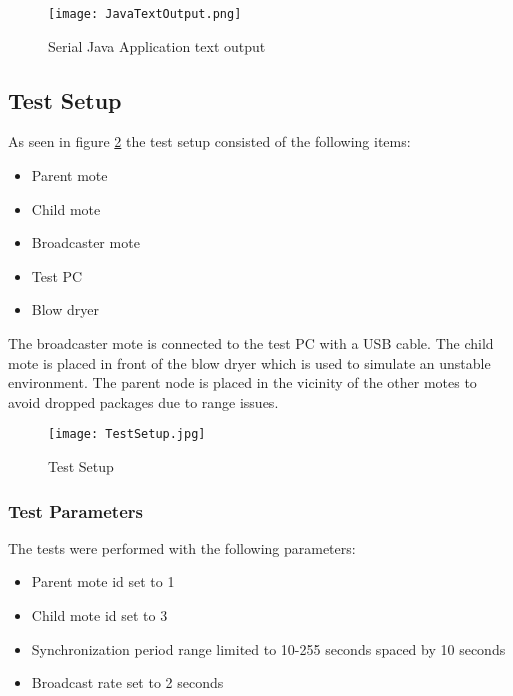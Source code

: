 \documentclass[Main]{subfiles}
\begin{document}
			\begin{figure}[H]
				\centering
				\texttt{[image: JavaTextOutput.png]}
				\caption{Serial Java Application text output}
				\label{fig:JavaTextOutput}
			\end{figure}

			


	\subsection{Test Setup} %
	\label{sub:test_setup}

		As seen in figure \ref{fig:TestSetup} the test setup consisted of the following items:

		\begin{itemize}
			\item Parent mote
			\item Child mote
			\item Broadcaster mote
			\item Test PC
			\item Blow dryer 
		\end{itemize}

		The broadcaster mote is connected to the test PC with a USB cable.
		The child mote is placed in front of the blow dryer which is used to simulate an unstable environment.
		The parent node is placed in the vicinity of the other motes to avoid dropped packages due to range issues.

		\begin{figure}[H]
			\centering
			\texttt{[image: TestSetup.jpg]}
			\caption{Test Setup}
			\label{fig:TestSetup}
		\end{figure}

		\subsubsection{Test Parameters} %
		\label{subsub:test_parameters}
			The tests were performed with the following parameters:

			\begin{itemize}
				\item Parent mote id set to 1
				\item Child mote id set to 3
				\item Synchronization period range limited to 10-255 seconds spaced by 10 seconds
				\item Broadcast rate set to 2 seconds
			\end{itemize}
		
\end{document}

